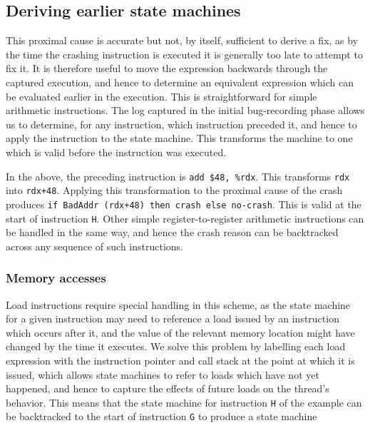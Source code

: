 \documentclass[10pt,twocolumn,preprint,natbib,authoryear]{sigplanconf}
\newcommand{\editorial}[1]{}
\begin{document}
\subsection{Deriving earlier state machines}
This proximal cause is accurate but not, by itself, sufficient to
derive a fix, as by the time the crashing instruction is executed it
is generally too late to attempt to fix it.  It is therefore useful to
move the expression backwards through the captured execution, and
hence to determine an equivalent expression which can be evaluated
earlier in the execution.  This is straightforward for simple
arithmetic instructions.  The log captured in the initial
bug-recording phase allows us to determine, for any instruction, which
instruction preceded it, and hence to apply the instruction to the
state machine.  This transforms the machine to one which is valid
before the instruction was executed.

In the above, the preceding instruction is \verb|add $48, %rdx|.  This
transforms \verb|rdx| into \verb|rdx+48|.  Applying this
transformation to the proximal cause of the crash produces
\verb|if BadAddr (rdx+48) then crash else no-crash|.  This is valid at
the start of instruction \verb|H|.  Other simple register-to-register
arithmetic instructions can be handled in the same way, and hence the
crash reason can be backtracked across any sequence of such
instructions.

\editorial{Our implementation uses libVEX to decode x86 instructions
  into a sequence of micro-operations which can be used as input to
  this process.} 

\subsubsection{Memory accesses}

Load instructions require special handling in this scheme, as the
state machine for a given instruction may need to reference a load
issued by an instruction which occurs after it, and the value of the
relevant memory location might have changed by the time it executes.
We solve this problem by labelling each load expression with the
instruction pointer and call stack at the point at which it is issued,
which allows state machines to refer to loads which have not yet
happened, and hence to capture the effects of future loads on the
thread's behavior.  This means that the state machine for instruction
\verb|H| of the example can be backtracked to the start of instruction
\verb|G| to produce a state machine
\end{document}
